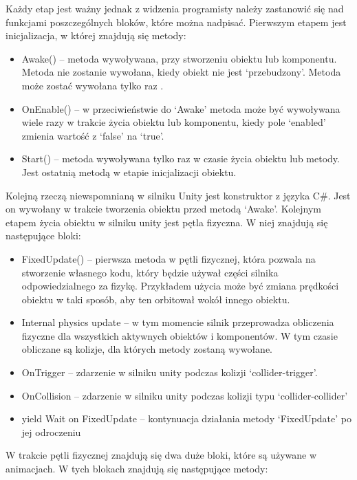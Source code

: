 \documentclass[12pt,twoside]{article}
\begin{document}
Każdy etap jest ważny jednak z widzenia programisty należy zastanowić się nad
funkcjami poszczególnych bloków, które można nadpisać. Pierwszym etapem jest
inicjalizacja, w której znajdują się metody:
\begin{itemize}
\item Awake() – metoda wywoływana, przy stworzeniu obiektu lub komponentu.
Metoda nie zostanie wywołana, kiedy obiekt nie jest ‘przebudzony’. Metoda może
zostać wywołana tylko raz \cite{Unity:Awake}.
\item OnEnable() – w przeciwieństwie do ‘Awake’ metoda może być wywoływana wiele
razy w trakcie życia obiektu lub komponentu, kiedy pole ‘enabled’ zmienia
wartość z ‘false’ na ‘true’.
\item Start() – metoda wywoływana tylko raz w czasie życia obiektu lub metody.
Jest ostatnią metodą w etapie inicjalizacji obiektu. 
\end{itemize}
Kolejną rzeczą niewspomnianą w silniku Unity jest konstruktor z języka C\#. Jest
on wywołany w trakcie tworzenia obiektu przed metodą ‘Awake’. Kolejnym etapem
życia obiektu w silniku unity jest pętla fizyczna. W niej znajdują się
następujące bloki: 
\begin{itemize}
\item FixedUpdate() – pierwsza metoda w pętli fizycznej, która pozwala na
stworzenie własnego kodu, który będzie używał części silnika odpowiedzialnego za
fizykę. Przykładem użycia może być zmiana prędkości obiektu w taki sposób, aby
ten orbitował wokół innego obiektu. 
\item Internal physics update – w tym momencie silnik przeprowadza obliczenia
fizyczne dla wszystkich aktywnych obiektów i komponentów. W tym czasie obliczane
są kolizje, dla których metody zostaną wywołane. 
\item OnTrigger – zdarzenie w silniku unity podczas kolizji ‘collider-trigger’. 
\item OnCollision – zdarzenie w silniku unity podczas kolizji typu
‘collider-collider’
\item yield Wait on FixedUpdate – kontynuacja działania metody ‘FixedUpdate’ po
jej odroczeniu \cite{Unity:yield}
\end{itemize}
W trakcie pętli fizycznej znajdują się dwa duże bloki, które są używane w
animacjach. W tych blokach znajdują się następujące metody:
\end{document}
